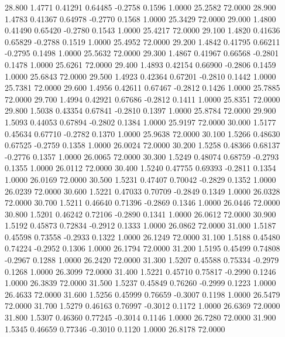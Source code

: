   28.800   1.4771   0.41291   0.64485  -0.2758   0.1596   1.0000  25.2582  72.0000
  28.900   1.4783   0.41367   0.64978  -0.2770   0.1568   1.0000  25.3429  72.0000
  29.000   1.4800   0.41490   0.65420  -0.2780   0.1543   1.0000  25.4217  72.0000
  29.100   1.4820   0.41636   0.65829  -0.2788   0.1519   1.0000  25.4952  72.0000
  29.200   1.4842   0.41795   0.66211  -0.2795   0.1498   1.0000  25.5632  72.0000
  29.300   1.4867   0.41967   0.66568  -0.2801   0.1478   1.0000  25.6261  72.0000
  29.400   1.4893   0.42154   0.66900  -0.2806   0.1459   1.0000  25.6843  72.0000
  29.500   1.4923   0.42364   0.67201  -0.2810   0.1442   1.0000  25.7381  72.0000
  29.600   1.4956   0.42611   0.67467  -0.2812   0.1426   1.0000  25.7885  72.0000
  29.700   1.4994   0.42921   0.67686  -0.2812   0.1411   1.0000  25.8351  72.0000
  29.800   1.5038   0.43354   0.67841  -0.2810   0.1397   1.0000  25.8784  72.0000
  29.900   1.5093   0.44053   0.67894  -0.2802   0.1384   1.0000  25.9197  72.0000
  30.000   1.5177   0.45634   0.67710  -0.2782   0.1370   1.0000  25.9638  72.0000
  30.100   1.5266   0.48630   0.67525  -0.2759   0.1358   1.0000  26.0024  72.0000
  30.200   1.5258   0.48366   0.68137  -0.2776   0.1357   1.0000  26.0065  72.0000
  30.300   1.5249   0.48074   0.68759  -0.2793   0.1355   1.0000  26.0112  72.0000
  30.400   1.5240   0.47755   0.69393  -0.2811   0.1354   1.0000  26.0169  72.0000
  30.500   1.5231   0.47407   0.70042  -0.2829   0.1352   1.0000  26.0239  72.0000
  30.600   1.5221   0.47033   0.70709  -0.2849   0.1349   1.0000  26.0328  72.0000
  30.700   1.5211   0.46640   0.71396  -0.2869   0.1346   1.0000  26.0446  72.0000
  30.800   1.5201   0.46242   0.72106  -0.2890   0.1341   1.0000  26.0612  72.0000
  30.900   1.5192   0.45873   0.72834  -0.2912   0.1333   1.0000  26.0862  72.0000
  31.000   1.5187   0.45598   0.73558  -0.2933   0.1322   1.0000  26.1249  72.0000
  31.100   1.5188   0.45480   0.74224  -0.2952   0.1306   1.0000  26.1794  72.0000
  31.200   1.5195   0.45499   0.74808  -0.2967   0.1288   1.0000  26.2420  72.0000
  31.300   1.5207   0.45588   0.75334  -0.2979   0.1268   1.0000  26.3099  72.0000
  31.400   1.5221   0.45710   0.75817  -0.2990   0.1246   1.0000  26.3839  72.0000
  31.500   1.5237   0.45849   0.76260  -0.2999   0.1223   1.0000  26.4633  72.0000
  31.600   1.5256   0.45999   0.76659  -0.3007   0.1198   1.0000  26.5479  72.0000
  31.700   1.5279   0.46163   0.76997  -0.3012   0.1172   1.0000  26.6369  72.0000
  31.800   1.5307   0.46360   0.77245  -0.3014   0.1146   1.0000  26.7280  72.0000
  31.900   1.5345   0.46659   0.77346  -0.3010   0.1120   1.0000  26.8178  72.0000
